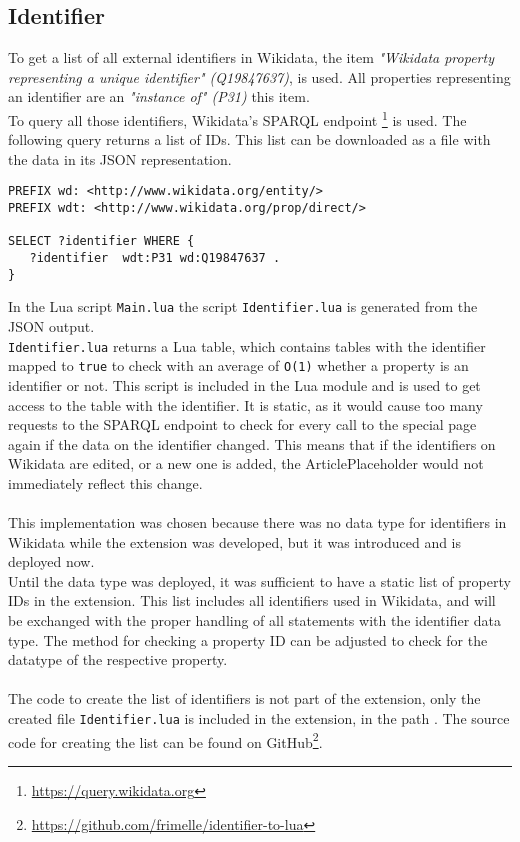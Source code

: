 \subsection{Identifier}

To get a list of all external identifiers in Wikidata, the item \textit{"Wikidata property representing a unique identifier" (Q19847637)}, is used. All properties representing an identifier are an \textit{"instance of" (P31)} this item. \\
To query all those identifiers, Wikidata's SPARQL endpoint \footnote{\href{https://query.wikidata.org}{https://query.wikidata.org}} is used. The following query returns a list of IDs. This list can be downloaded as a file with the data in its JSON representation. \\

\begin{lstlisting}[frame=single] 
PREFIX wd: <http://www.wikidata.org/entity/>
PREFIX wdt: <http://www.wikidata.org/prop/direct/>

SELECT ?identifier WHERE {
   ?identifier  wdt:P31 wd:Q19847637 . 
}
\end{lstlisting}
In the Lua script \texttt{\justify Main.lua} the script \texttt{\justify Identifier.lua} is generated from the JSON output. \\  \texttt{\justify Identifier.lua} returns a Lua table, which contains tables with the identifier mapped to \texttt{true} to check with an average of \texttt{\justify O(1)} whether a property is an identifier or not. This script is included in the Lua module and is used to get access to the table with the identifier. It is static, as it would cause too many requests to the SPARQL endpoint to check for every call to the special page again if the data on the identifier changed. This means that if the identifiers on Wikidata are edited, or a new one is added, the ArticlePlaceholder would not immediately reflect this change. \\
\\
This implementation was chosen because there was no data type for identifiers in Wikidata while the extension was developed, but it was introduced and is deployed now. \\
Until the data type was deployed, it was sufficient to have a static list of property IDs in the extension. This list includes all identifiers used in Wikidata, and will be exchanged with the proper handling of all statements with the identifier data type. The method for checking a property ID can be adjusted to check for the datatype of the respective property. \\
\\
The code to create the list of identifiers is not part of the extension, only the created file \texttt{\justify Identifier.lua} is included in the extension, in the path . The source code for creating the list can be found on GitHub\footnote{\href{https://github.com/frimelle/identifier-to-lua}{https://github.com/frimelle/identifier-to-lua}}. 
